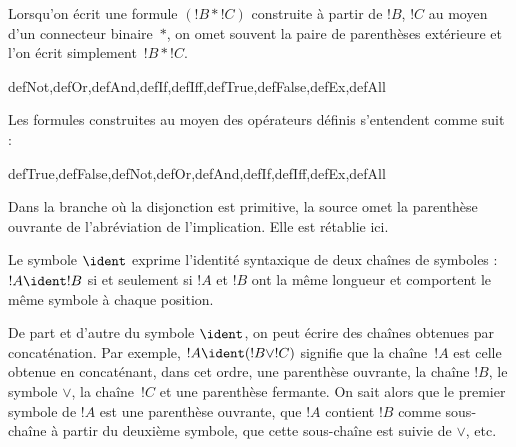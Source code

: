\documentclass[11pt,a4paper,openany]{memoir}
\begin{document}
Lorsqu'on écrit une formule $(!B \ast !C)$ construite à partir de
$!B$, $!C$ au moyen d'un connecteur binaire~$\ast$, on omet souvent
la paire de parenthèses extérieure et l'on écrit simplement~$!B \ast !C$.

\begin{tagblock}{defNot,defOr,defAnd,defIf,defIff,defTrue,defFalse,defEx,defAll}
\begin{defn}
Les formules construites au moyen des opérateurs définis s'entendent
comme suit :

\begin{tagenumerate}{defTrue,defFalse,defNot,defOr,defAnd,defIf,defIff,defEx,defAll}







\end{tagenumerate}
\end{defn}
\begin{editorial}
Dans la branche où la disjonction est primitive, la source omet la
parenthèse ouvrante de l'abréviation de l'implication. Elle est rétablie ici.
\end{editorial}
\end{tagblock}

\begin{defn}
Le symbole $\ident$ exprime l'identité syntaxique de deux chaînes de
symboles : $!A \ident !B$ si et seulement si $!A$ et $!B$ ont la même
longueur et comportent le même symbole à chaque position.
\end{defn}

De part et d'autre du symbole $\ident$, on peut écrire des chaînes
obtenues par concaténation. Par exemple, $!A \ident (!B \lor !C)$
signifie que la chaîne~$!A$ est celle obtenue en concaténant, dans cet
ordre, une parenthèse ouvrante, la chaîne $!B$, le symbole $\lor$,
la chaîne~$!C$ et une parenthèse fermante. On sait alors que le premier
symbole de $!A$ est une parenthèse ouvrante, que $!A$ contient $!B$
comme sous-chaîne à partir du deuxième symbole, que cette sous-chaîne
est suivie de $\lor$, etc.
\end{document}

